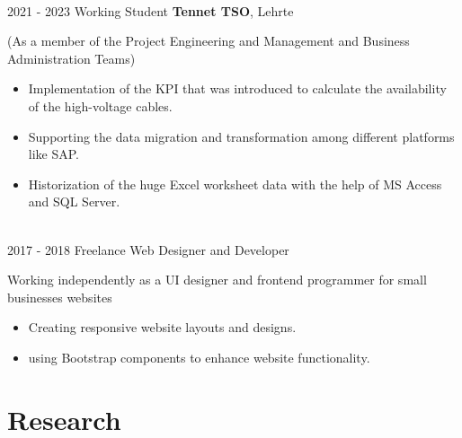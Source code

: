 \documentclass[a4paper]{mctemplate} %
\begin{document}
\begin{main}
\begin{experiencelist}
{        }\\
	\experienceitem
    	{2021 - 2023}
        {Working Student}
        {\textbf{Tennet TSO}, Lehrte}
        {(As a member of the Project Engineering and Management and Business Administration Teams)
          \begin{itemize}
              \item Implementation of the KPI that was introduced to calculate the availability of the high-voltage cables.
          \end{itemize}
          
          \begin{itemize}
              \item Supporting the data migration and transformation among different platforms like SAP.
          \end{itemize}         
          
          \begin{itemize}
              \item Historization of the huge Excel worksheet data with the help of MS Access and SQL Server.
          \end{itemize}}\\

          
    \experienceitem
        {2017 - 2018}
        {Freelance Web Designer and Developer}
        
        {Working independently as a UI designer and frontend programmer for small businesses 
        websites 
        \begin{itemize}
        \item Creating responsive website layouts and designs.
        \item using Bootstrap components to enhance website functionality.
        \end{itemize}
}\end{experiencelist}


\section{Research}
\vspace{-.2cm}


\end{main}
\end{document}

